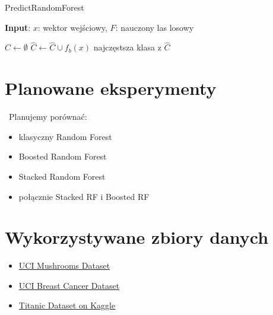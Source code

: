 \documentclass[10pt,a4paper]{article}
\begin{document}
\begin{algorithm}
\caption{PredictRandomForest}\label{alg:rf_predict}
\hspace*{\algorithmicindent} \textbf{Input}: $x$: wektor wejściowy, $F$: nauczony las losowy
\begin{algorithmic}[H]
	\State $\hat C \gets \emptyset$
		\State $\hat C \gets \hat C \cup {f_b(x)}$
	\EndFor
	\State \Return najczęstsza klasa z $\hat C$
\end{algorithmic}
\end{algorithm}

\section{Planowane eksperymenty}\
Planujemy porównać:

\begin{itemize}
    \item klasyczny Random Forest
    \item Boosted Random Forest
    \item Stacked Random Forest
    \item połącznie Stacked RF i Boosted RF
\end{itemize}


\section{Wykorzystywane zbiory danych}
\begin{itemize}
    \item \href{https://archive.ics.uci.edu/ml/datasets/Mushroom}{UCI Mushrooms Dataset}
    \item \href{https://archive.ics.uci.edu/ml/datasets/Breast+Cancer}{UCI Breast Cancer Dataset}
    \item \href{https://www.kaggle.com/datasets/vinicius150987/titanic3}{Titanic Dataset on Kaggle}
\end{itemize}
\end{document}
